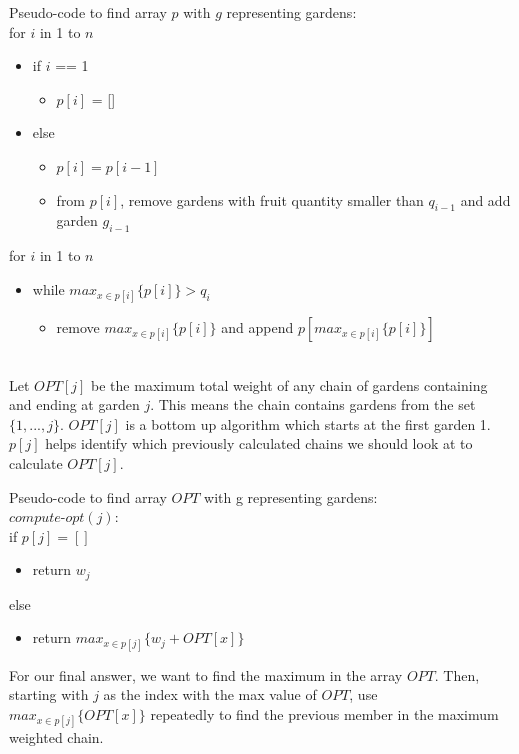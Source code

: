 \documentclass{article}
\begin{document}
\begin{enumerate}
\begin{enumerate}
        Pseudo-code to find array $p$ with $g$ representing gardens:\\
        for $i$ in 1 to $n$
        \begin{itemize}
            \item if $i$ == 1
            \begin{itemize}
                \item $p[i]$ = []
            \end{itemize}
            \item else
            \begin{itemize}
            							\item $p[i] = p[i-1]$
                \item from $p[i]$, remove gardens with fruit quantity smaller than $q_{i-1}$ and add garden $g_{i-1}$
            \end{itemize}
        \end{itemize}
        for $i$ in 1 to $n$
        \begin{itemize}
            \item while $max_{x\in p[i]}\{p[i]\} > q_i$
            \begin{itemize}
                \item remove $max_{x\in p[i]}\{p[i]\}$ and append $p[max_{x\in p[i]}\{p[i]\}]$
            \end{itemize}
        \end{itemize}
        
        \\
        Let $OPT[j]$ be the maximum total weight of any chain of gardens containing and ending at garden $j$. This means the chain contains gardens from the set $\{ 1, ..., j\}$. $OPT[j]$ is a bottom up algorithm which starts at the first garden 1. $p[j]$ helps identify which previously calculated chains we should look at to calculate $OPT[j]$.
        
        Pseudo-code to find array $OPT$ with g representing gardens:\\ $compute$-$opt(j)$:\\
        if $p[j] = []$
        \begin{itemize}
            \item return $w_j$
        \end{itemize}
        else
        \begin{itemize}
            \item return $max_{x \in p[j]}\{w_j + OPT[x]\}$
        \end{itemize}
        For our final answer, we want to find the maximum in the array $OPT$. Then, starting with $j$ as the index with the max value of $OPT$, use $max_{x \in p[j]} \{OPT[x]\}$ repeatedly to find the previous member in the maximum weighted chain.
        

\end{enumerate}
\end{enumerate}
\end{document}
